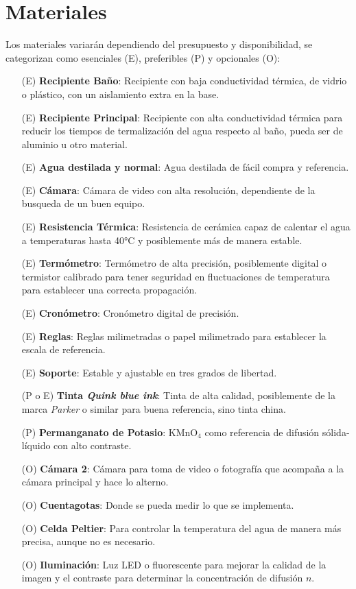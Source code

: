 \documentclass{article}[13pt]
\begin{document}
\section*{Materiales}
Los materiales variarán dependiendo del presupuesto y disponibilidad, se categorizan como esenciales (E), preferibles (P) y opcionales (O):
\begin{itemize}
    \item[(E)] \textbf{Recipiente Baño}: Recipiente con baja conductividad térmica, de vidrio o plástico, con un aislamiento extra en la base.
    \item[(E)] \textbf{Recipiente Principal}: Recipiente con alta conductividad térmica para reducir los tiempos de termalización del agua respecto al baño, pueda ser de aluminio u otro material.
    \item[(E)] \textbf{Agua destilada y normal}: Agua destilada de fácil compra y referencia.
    \item[(E)] \textbf{Cámara}: Cámara de video con alta resolución, dependiente de la busqueda de un buen equipo.
    \item[(E)] \textbf{Resistencia Térmica}: Resistencia de cerámica capaz de calentar el agua a temperaturas hasta 40°C y posiblemente más de manera estable.
    \item[(E)] \textbf{Termómetro}: Termómetro de alta precisión, posiblemente digital o termistor calibrado para tener seguridad en fluctuaciones de temperatura para establecer una correcta propagación.
    \item[(E)] \textbf{Cronómetro}: Cronómetro digital de precisión.
    \item[(E)] \textbf{Reglas}: Reglas milimetradas o papel milimetrado para establecer la escala de referencia.
    \item[(E)] \textbf{Soporte}: Estable y ajustable en tres grados de libertad.
    \item[(P o E)] \textbf{Tinta \textit{Quink blue ink}}: Tinta de alta calidad, posiblemente de la marca \textit{Parker} o similar para buena referencia, sino tinta china.
    \item[(P)] \textbf{Permanganato de Potasio}: KMnO$_4$ como referencia de difusión sólida-líquido con alto contraste.
    \item[(O)] \textbf{Cámara 2}: Cámara para toma de video o fotografía que acompaña a la cámara principal y hace lo alterno.
    \item[(O)] \textbf{Cuentagotas}: Donde se pueda medir lo que se implementa.
    \item[(O)] \textbf{Celda Peltier}: Para controlar la temperatura del agua de manera más precisa, aunque no es necesario.
    \item[(O)] \textbf{Iluminación}: Luz LED o fluorescente para mejorar la calidad de la imagen y el contraste para determinar la concentración de difusión $n$.
\end{itemize}
\end{document}
